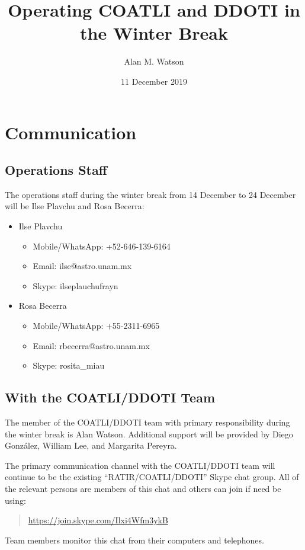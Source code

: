 \documentclass{article}
\title{\bfseries Operating COATLI and DDOTI in the Winter Break}
\author{Alan M. Watson}
\date{11 December 2019}
\begin{document}
\maketitle

\section{Communication}

\subsection{Operations Staff}

The operations staff during the winter break from 14 December to 24 December will be Ilse Plavchu and Rosa Becerra:

\begin{itemize}
\item
Ilse Plavchu
\begin{itemize}
\item Mobile/WhatsApp: +52-646-139-6164
\item Email: ilse@astro.unam.mx
\item Skype: ilseplauchufrayn
\end{itemize}
\item
Rosa Becerra
\begin{itemize}
\item Mobile/WhatsApp: +55-2311-6965
\item Email: rbecerra@astro.unam.mx
\item Skype: rosita\_miau
\end{itemize}
\end{itemize}


\subsection{With the COATLI/DDOTI Team}

The member of the COATLI/DDOTI team with primary responsibility during the winter break is Alan Watson. Additional support will be provided by Diego González, William Lee, and Margarita Pereyra.

The primary communication channel with the COATLI/DDOTI team will continue to be the existing “RATIR/COATLI/DDOTI” Skype chat group. All of the relevant persons are members of this chat and others can join if need be using:
\begin{quotation}
\url{https://join.skype.com/Ilxi4Wfm3ykB}
\end{quotation}
Team members monitor this chat from their computers and telephones.
\end{document}
